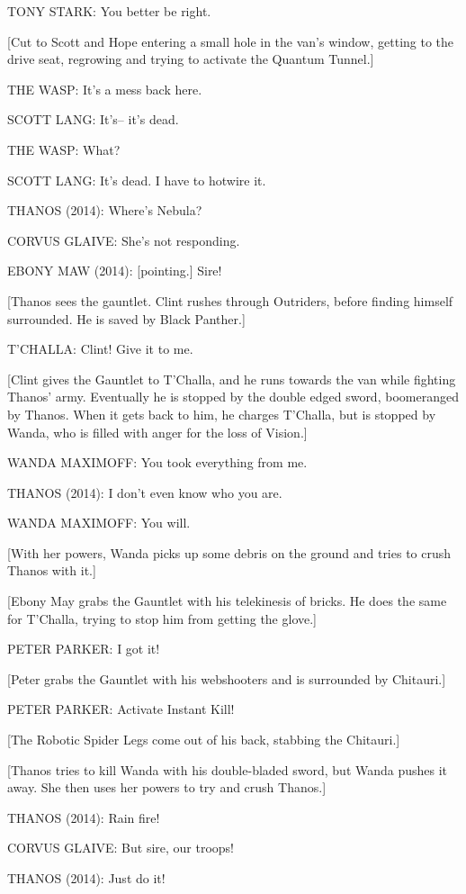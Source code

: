 TONY STARK: You better be right.

[Cut to Scott and Hope entering a small hole in the van's window, getting to the drive seat, regrowing and trying to activate the Quantum Tunnel.]

THE WASP: It's a mess back here.

SCOTT LANG: It's– it's dead.

THE WASP: What?

SCOTT LANG: It's dead. I have to hotwire it.

THANOS (2014): Where's Nebula?

CORVUS GLAIVE: She's not responding.

EBONY MAW (2014): [pointing.] Sire!

[Thanos sees the gauntlet. Clint rushes through Outriders, before finding himself surrounded. He is saved by Black Panther.]

T'CHALLA: Clint! Give it to me.

[Clint gives the Gauntlet to T'Challa, and he runs towards the van while fighting Thanos' army. Eventually he is stopped by the double edged sword, boomeranged by Thanos. When it gets back to him, he charges T'Challa, but is stopped by Wanda, who is filled with anger for the loss of Vision.]

WANDA MAXIMOFF: You took everything from me.

THANOS (2014): I don't even know who you are.

WANDA MAXIMOFF: You will.

[With her powers, Wanda picks up some debris on the ground and tries to crush Thanos with it.]

[Ebony May grabs the Gauntlet with his telekinesis of bricks. He does the same for T'Challa, trying to stop him from getting the glove.]

PETER PARKER: I got it!

[Peter grabs the Gauntlet with his webshooters and is surrounded by Chitauri.]

PETER PARKER: Activate Instant Kill!

[The Robotic Spider Legs come out of his back, stabbing the Chitauri.]

[Thanos tries to kill Wanda with his double-bladed sword, but Wanda pushes it away. She then uses her powers to try and crush Thanos.]

THANOS (2014): Rain fire!

CORVUS GLAIVE: But sire, our troops!

THANOS (2014): Just do it!

